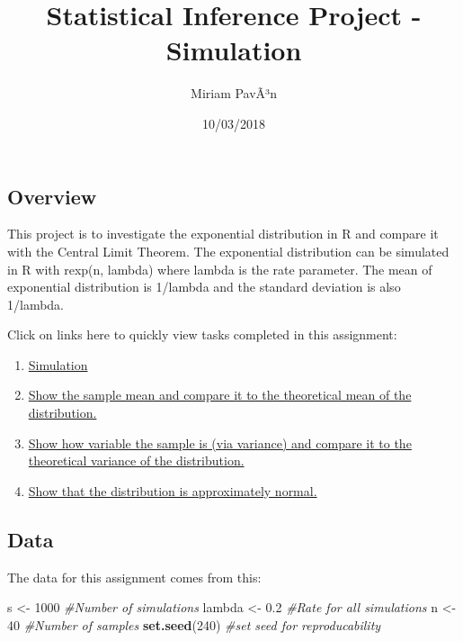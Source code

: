 \documentclass[]{article}
\title{Statistical Inference Project - Simulation}
\author{Miriam PavÃ³n}
\date{10/03/2018}
\newenvironment{Shaded}{\begin{snugshade}}{\end{snugshade}}
\newcommand{\KeywordTok}[1]{\textcolor[rgb]{0.13,0.29,0.53}{\textbf{{#1}}}}
\newcommand{\DecValTok}[1]{\textcolor[rgb]{0.00,0.00,0.81}{{#1}}}
\newcommand{\FloatTok}[1]{\textcolor[rgb]{0.00,0.00,0.81}{{#1}}}
\newcommand{\StringTok}[1]{\textcolor[rgb]{0.31,0.60,0.02}{{#1}}}
\newcommand{\CommentTok}[1]{\textcolor[rgb]{0.56,0.35,0.01}{\textit{{#1}}}}
\newcommand{\NormalTok}[1]{{#1}}
\providecommand{\tightlist}{%
  \setlength{\itemsep}{0pt}\setlength{\parskip}{0pt}}
\begin{document}
\maketitle

\subsection{Overview}\label{overview}

This project is to investigate the exponential distribution in R and
compare it with the Central Limit Theorem. The exponential distribution
can be simulated in R with rexp(n, lambda) where lambda is the rate
parameter. The mean of exponential distribution is 1/lambda and the
standard deviation is also 1/lambda.

Click on links here to quickly view tasks completed in this assignment:

\begin{enumerate}
\def\labelenumi{\arabic{enumi}.}
\tightlist
\item
  \protect\hyperlink{point1}{Simulation}
\item
  \protect\hyperlink{point2}{Show the sample mean and compare it to the
  theoretical mean of the distribution.}
\item
  \protect\hyperlink{point3}{Show how variable the sample is (via
  variance) and compare it to the theoretical variance of the
  distribution.}
\item
  \protect\hyperlink{point4}{Show that the distribution is approximately
  normal.}
\end{enumerate}

\subsection{Data}\label{data}

The data for this assignment comes from this:

\begin{Shaded}
\begin{Highlighting}[]
\NormalTok{s <-}\StringTok{ }\DecValTok{1000} \CommentTok{#Number of simulations}
\NormalTok{lambda <-}\StringTok{ }\FloatTok{0.2} \CommentTok{#Rate for all simulations}
\NormalTok{n <-}\StringTok{ }\DecValTok{40} \CommentTok{#Number of samples}
\KeywordTok{set.seed}\NormalTok{(}\DecValTok{240}\NormalTok{) }\CommentTok{#set seed for reproducability}
\end{Highlighting}
\end{Shaded}
\end{document}
